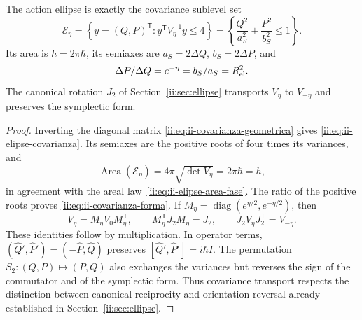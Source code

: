 \begin{proposition}
\label{ii:prop:ii-area-covarianza-reciprocidad}
The action ellipse is exactly the covariance sublevel set
\begin{equation}
 \mathcal E_\eta
 =\left\{y=(Q,P)^{\mathsf T}:y^{\mathsf T}V_\eta^{-1}y\leq4\right\}
 =\left\{\frac{Q^2}{a_S^2}+\frac{P^2}{b_S^2}\leq1\right\}.
 \label{ii:eq:ii-elipse-covarianza}
\end{equation}
Its area is \(h=2\pi\hbar\), its semiaxes are
\(a_S=2\Delta Q\), \(b_S=2\Delta P\), and
\begin{equation}
 \frac{\Delta P}{\Delta Q}=e^{-\eta}
 =\frac{b_S}{a_S}=R_{\rm el}^2.
 \label{ii:eq:ii-covarianza-forma}
\end{equation}
The canonical rotation \(J_2\) of Section~\ref{ii:sec:ellipse} transports
\(V_\eta\) to \(V_{-\eta}\) and preserves the symplectic form.
\end{proposition}

\begin{proof}
Inverting the diagonal matrix
\eqref{ii:eq:ii-covarianza-geometrica} gives
\eqref{ii:eq:ii-elipse-covarianza}. Its semiaxes are the positive roots of
four times its variances, and
\[
 \operatorname{Area}(\mathcal E_\eta)
 =4\pi\sqrt{\det V_\eta}=2\pi\hbar=h,
\]
in agreement with the areal law~\eqref{ii:eq:ii-elipse-area-fase}.
The ratio of the positive roots proves
\eqref{ii:eq:ii-covarianza-forma}.
If \(M_\eta=\operatorname{diag}(e^{\eta/2},e^{-\eta/2})\), then
\[
 V_\eta=M_\eta V_0M_\eta^{\mathsf T},\qquad
 M_\eta^{\mathsf T}J_2M_\eta=J_2,\qquad
 J_2V_\eta J_2^{\mathsf T}=V_{-\eta}.
\]
These identities follow by multiplication. In operator terms,
\((\widehat Q',\widehat P')=(-\widehat P,\widehat Q)\) preserves
\([\widehat Q',\widehat P']=i\hbar I\). The permutation
\(S_2:(Q,P)\mapsto(P,Q)\) also exchanges the variances but reverses
the sign of the commutator and of the symplectic form. Thus covariance
transport respects the distinction between canonical reciprocity and
orientation reversal already established in Section~\ref{ii:sec:ellipse}.
\end{proof}

